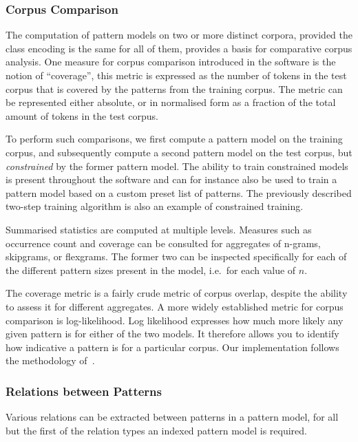 \documentclass[a4paper,12pt]{article}
\begin{document}
\subsubsection{Corpus Comparison}

The computation of pattern models on two or more distinct corpora, provided the
class encoding is the same for all of them, provides a basis for comparative
corpus analysis. One measure for corpus comparison introduced in the software
is the notion of ``coverage'', this metric is expressed as the number of tokens
in the test corpus that is covered by the patterns from the training corpus.
The metric can be represented either absolute, or in normalised form as a
fraction of the total amount of tokens in the test corpus. 

To perform such comparisons, we first compute a pattern model on the training
corpus, and subsequently compute a second pattern model on the test corpus, but
\emph{constrained} by the former pattern model. The ability to train
constrained models is present throughout the software and can for instance also
be used to train a pattern model based on a custom preset list of patterns. The
previously described two-step training algorithm is also an example of
constrained training.

Summarised statistics are computed at multiple levels. Measures such as
occurrence count and coverage can be consulted for aggregates of n-grams,
skipgrams, or flexgrams. The former two can be inspected specifically for each
of the different pattern sizes present in the model, i.e.\ for each value of $n$.

The coverage metric is a fairly crude metric of corpus overlap, despite the
ability to assess it for different aggregates. A more widely established metric
for corpus comparison is log-likelihood. Log likelihood expresses how much more
likely any given pattern is for either of the two models. It therefore allows
you to identify how indicative a pattern is for a particular corpus. Our
implementation follows the methodology of~\cite{Rayson00comparingcorpora}.

\subsubsection{Relations between Patterns}

Various relations can be extracted between patterns in a pattern model, for all
but the first of the relation types an indexed pattern model is required.
\end{document}
